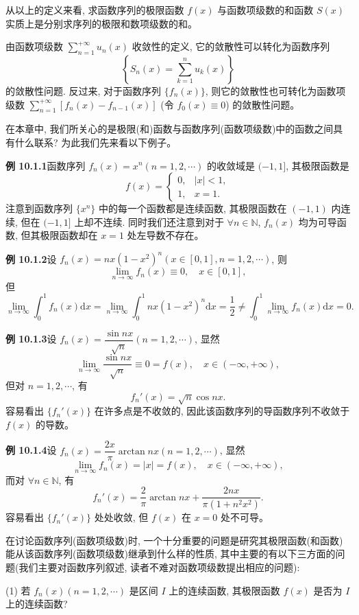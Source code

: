 \documentclass[UTF8, 12pt, fontset=fandol, oneside]{ctexart}
\begin{document}
从以上的定义来看, 求函数序列的极限函数 $f(x)$ 与函数项级数的和函数 $S(x)$ 实质上是分别求序列的极限和数项级数的和。

由函数项级数 $\sum\limits_{n=1}^{+\infty}u_n(x)$ 收敛性的定义, 它的敛散性可以转化为函数序列
\[
  \left\{S_n(x)=\sum_{k=1}^n u_k(x)\right\}
\]
的敛散性问题. 反过来, 对于函数序列 $\{f_n(x)\}$, 则它的敛散性也可转化为函数项级数 $\sum\limits_{n=1}^{+\infty}[f_n(x)-f_{n-1}(x)]$ (令 $f_0(x)\equiv0$) 的敛散性问题。

在本章中, 我们所关心的是极限(和)函数与函数序列(函数项级数)中的函数之间具有什么联系? 为此我们先来看以下例子。

\noindent\textbf{例 10.1.1}\quad 函数序列 $f_n(x)=x^n(n=1,2,\cdots)$ 的收敛域是 $(-1,1]$, 其极限函数是
\[
  f(x)=
  \begin{cases}
    0, & |x|<1,\\
    1, & x=1.
  \end{cases}
\]
注意到函数序列 $\{x^n\}$ 中的每一个函数都是连续函数, 其极限函数在 $(-1,1)$ 内连续, 但在 $(-1,1]$ 上却不连续. 同时我们还注意到对于 $\forall n\in\mathbb N$, $f_n(x)$ 均为可导函数, 但其极限函数却在 $x=1$ 处左导数不存在。

\noindent\textbf{例 10.1.2}\quad 设 $f_n(x)=nx(1-x^2)^n(x\in[0,1],n=1,2,\cdots)$, 则
\[
  \lim_{n\to\infty}f_n(x)\equiv0,\quad x\in[0,1],
\]
但
\[
  \lim_{n\to\infty}\int_0^1 f_n(x)\mathrm dx
  =\lim_{n\to\infty}\int_0^1 nx(1-x^2)^n\mathrm dx
  =\frac12
  \ne \int_0^1\lim_{n\to\infty}f_n(x)\mathrm dx=0.
\]

\noindent\textbf{例 10.1.3}\quad 设 $f_n(x)=\dfrac{\sin nx}{\sqrt n}(n=1,2,\cdots)$, 显然
\[
  \lim_{n\to\infty}\frac{\sin nx}{\sqrt n}\equiv0=f(x),\quad x\in(-\infty,+\infty),
\]
但对 $n=1,2,\cdots$, 有
\[
  f_n'(x)=\sqrt n\cos nx.
\]
容易看出 $\{f_n'(x)\}$ 在许多点是不收敛的, 因此该函数序列的导函数序列不收敛于 $f(x)$ 的导数。

\noindent\textbf{例 10.1.4}\quad 设 $f_n(x)=\dfrac{2x}{\pi}\arctan nx(n=1,2,\cdots)$, 显然
\[
  \lim_{n\to\infty}f_n(x)=|x|=f(x),\quad x\in(-\infty,+\infty),
\]
而对 $\forall n\in\mathbb N$, 有
\[
  f_n'(x)=\frac2\pi\arctan nx+\frac{2nx}{\pi(1+n^2x^2)}.
\]
容易看出 $\{f_n'(x)\}$ 处处收敛, 但 $f(x)$ 在 $x=0$ 处不可导。

在讨论函数序列(函数项级数)时, 一个十分重要的问题是研究其极限函数(和函数)能从该函数序列(函数项级数)继承到什么样的性质, 其中主要的有以下三方面的问题(我们主要对函数序列叙述, 读者不难对函数项级数提出相应的问题):

(1) 若 $f_n(x)(n=1,2,\cdots)$ 是区间 $I$ 上的连续函数, 其极限函数 $f(x)$ 是否为 $I$ 上的连续函数?
\end{document}
